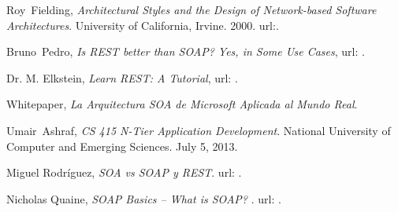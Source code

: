 \documentclass[conference]{IEEEtran}
\begin{document}
\begin{thebibliography}{1}


  Roy~Fielding, \emph{Architectural Styles and the Design of
    Network-based Software Architectures}. University of California,
  Irvine. 2000. url:\texttt{}.

Bruno~Pedro, \emph{Is REST better than SOAP? Yes, in Some Use Cases},
url:
\texttt{}.

  Dr. M. Elkstein, \emph{Learn REST: A Tutorial},
url: \texttt{}.

  Whitepaper, \emph{La Arquitectura SOA de Microsoft Aplicada al Mundo
  Real}.

  Umair~Ashraf, \emph{CS 415 N-Tier Application Development}. National
  University of Computer and Emerging Sciences. July 5, 2013.

  Miguel Rodríguez, \emph{SOA vs SOAP y REST}. url:
  \texttt{}.

  Nicholas Quaine, \emph{ SOAP Basics -- What is SOAP? }. url:
  \texttt{}.

\end{thebibliography}

\end{document}
